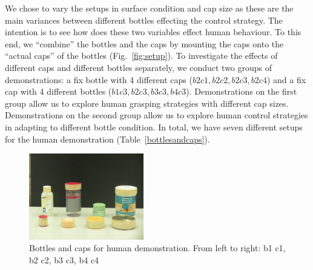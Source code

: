 
We chose to vary the setups in surface condition and cap size as these are the main variances between different bottles effecting the control strategy. The intention is to see how does these two variables effect human behaviour. To this end, we ``combine'' the bottles and the caps by mounting the caps onto the ``actual caps'' of the bottles (Fig.~\ref{fig:setup}). To investigate the effects of different caps and different bottles separately, we conduct two groups of demonstrations: a fix bottle with 4 different caps ($b2c1, b2c2, b2c3, b2c4$) and a fix cap with 4 different bottles ($b1c3, b2c3, b3c3, b4c3$). Demonstrations on the first group allow us to explore human grasping strategies with different cap sizes. Demonstrations on the second group allow us to explore human control strategies in adapting to different bottle condition. In total, we have seven different setups for the human demonstration (Table~\ref{bottlesandcaps}).


\begin{figure}
  \centering
  \includegraphics[width=5cm]{./fig/b_c.jpg}
  \caption{ \scriptsize{Bottles and caps for human demonstration. From left to right: b1 c1, b2 c2, b3 c3, b4  c4}
}
\label{fig:b_c}
\end{figure}





